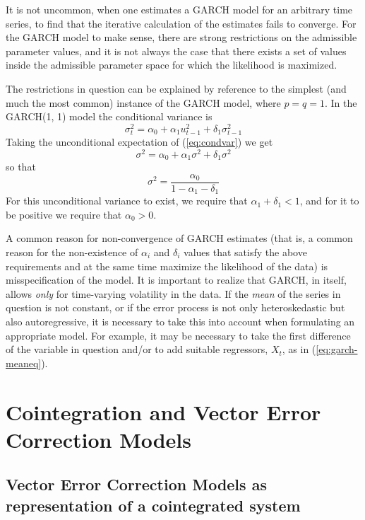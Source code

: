It is not uncommon, when one estimates a GARCH model for an arbitrary
time series, to find that the iterative calculation of the estimates
fails to converge.  For the GARCH model to make sense, there are
strong restrictions on the admissible parameter values, and it is not
always the case that there exists a set of values inside the
admissible parameter space for which the likelihood is maximized.  

The restrictions in question can be explained by reference to the
simplest (and much the most common) instance of the GARCH model, where
$p = q = 1$.  In the GARCH(1, 1) model the conditional variance is
\begin{equation}
\label{eq:condvar}
\sigma^2_t = \alpha_0 + \alpha_1 u^2_{t-1} + \delta_1 \sigma^2_{t-1}
\end{equation}
Taking the unconditional expectation of (\ref{eq:condvar}) we get
\[
\sigma^2 = \alpha_0 + \alpha_1 \sigma^2 + \delta_1 \sigma^2
\]
so that
\[
\sigma^2 = \frac{\alpha_0}{1 - \alpha_1 - \delta_1}
\]
For this unconditional variance to exist, we require that $\alpha_1 +
\delta_1 < 1$, and for it to be positive we require that $\alpha_0 > 0$.

A common reason for non-convergence of GARCH estimates (that is, a
common reason for the non-existence of $\alpha_i$ and $\delta_i$ values
that satisfy the above requirements and at the same time maximize the
likelihood of the data) is misspecification of the model.  It is
important to realize that GARCH, in itself, allows \textit{only} for
time-varying volatility in the data.  If the \textit{mean} of the
series in question is not constant, or if the error process is not
only heteroskedastic but also autoregressive, it is necessary to take
this into account when formulating an appropriate model.  For example,
it may be necessary to take the first difference of the variable in
question and/or to add suitable regressors, $X_t$, as in
(\ref{eq:garch-meaneq}).

\section{Cointegration and Vector Error Correction Models}
\label{vecm-explanation}

\subsection{Vector Error Correction Models as representation of a
  cointegrated system}
\label{sec:VECM-rep}

